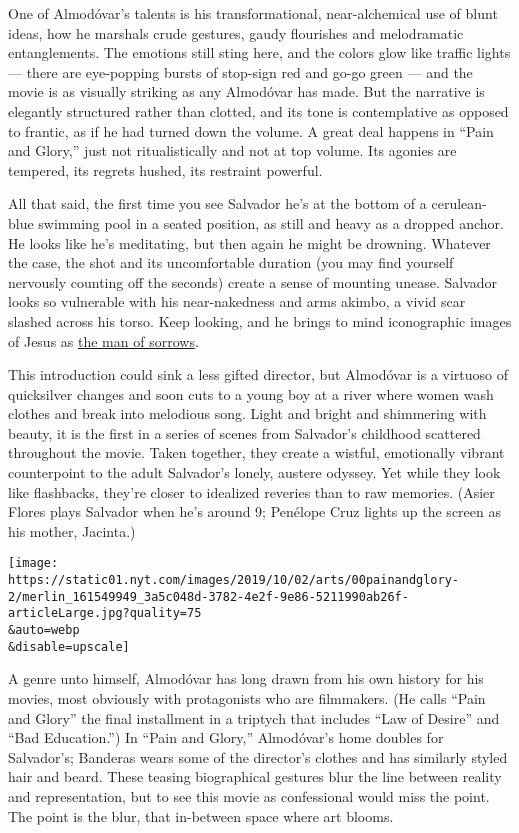 One of Almodóvar's talents is his transformational, near-alchemical use
of blunt ideas, how he marshals crude gestures, gaudy flourishes and
melodramatic entanglements. The emotions still sting here, and the
colors glow like traffic lights --- there are eye-popping bursts of
stop-sign red and go-go green --- and the movie is as visually striking
as any Almodóvar has made. But the narrative is elegantly structured
rather than clotted, and its tone is contemplative as opposed to
frantic, as if he had turned down the volume. A great deal happens in
``Pain and Glory,'' just not ritualistically and not at top volume. Its
agonies are tempered, its regrets hushed, its restraint powerful.

All that said, the first time you see Salvador he's at the bottom of a
cerulean-blue swimming pool in a seated position, as still and heavy as
a dropped anchor. He looks like he's meditating, but then again he might
be drowning. Whatever the case, the shot and its uncomfortable duration
(you may find yourself nervously counting off the seconds) create a
sense of mounting unease. Salvador looks so vulnerable with his
near-nakedness and arms akimbo, a vivid scar slashed across his torso.
Keep looking, and he brings to mind iconographic images of Jesus as
\href{https://www.metmuseum.org/toah/works-of-art/1982.480/}{the man of
sorrows}.

This introduction could sink a less gifted director, but Almodóvar is a
virtuoso of quicksilver changes and soon cuts to a young boy at a river
where women wash clothes and break into melodious song. Light and bright
and shimmering with beauty, it is the first in a series of scenes from
Salvador's childhood scattered throughout the movie. Taken together,
they create a wistful, emotionally vibrant counterpoint to the adult
Salvador's lonely, austere odyssey. Yet while they look like flashbacks,
they're closer to idealized reveries than to raw memories. (Asier Flores
plays Salvador when he's around 9; Penélope Cruz lights up the screen as
his mother, Jacinta.)

\texttt{[image: https://static01.nyt.com/images/2019/10/02/arts/00painandglory-2/merlin\_161549949\_3a5c048d-3782-4e2f-9e86-5211990ab26f-articleLarge.jpg?quality=75\\\&auto=webp\\\&disable=upscale]}

A genre unto himself, Almodóvar has long drawn from his own history for
his movies, most obviously with protagonists who are filmmakers. (He
calls ``Pain and Glory'' the final installment in a triptych that
includes ``Law of Desire'' and ``Bad Education.'') In ``Pain and
Glory,'' Almodóvar's home doubles for Salvador's; Banderas wears some of
the director's clothes and has similarly styled hair and beard. These
teasing biographical gestures blur the line between reality and
representation, but to see this movie as confessional would miss the
point. The point is the blur, that in-between space where art blooms.

